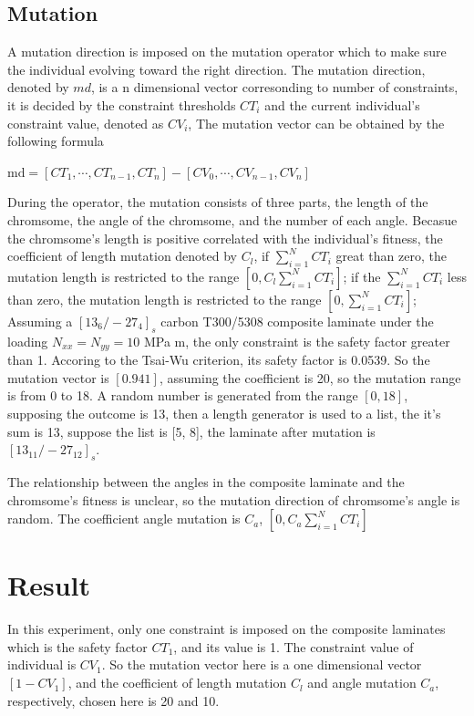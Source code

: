 \documentclass{article}
\begin{document}
\subsection{Mutation}
A mutation direction is imposed on the mutation operator which to make sure the individual evolving
toward the right direction. The mutation direction, denoted by $md$, is a n dimensional vector corresonding to
number of constraints, it is decided by the constraint thresholds $CT_i$ and the current individual's
constraint value, denoted as $CV_i$,  The mutation vector can be obtained by the following formula

$\text{md} = [CT_1, \cdots, CT_{n-1}, CT_n] -  [CV_0, \cdots, CV_{n-1}, CV_n]$

During the operator, the mutation consists of three parts, the length of the chromsome, the angle
of the chromsome, and the number of each angle. Becasue the chromsome's length is positive correlated with the individual's
fitness, the coefficient of length mutation denoted by $C_l$, if $\sum_{i=1}^{N}{CT_i}$ great than
zero, the mutation length is restricted to the range $[0,C_l \sum_{i=1}^{N}{CT_i}]$; if the
$\sum_{i=1}^{N}{CT_i}$ less than zero, the mutation length is restricted to the range
$[0,\sum_{i=1}^{N}{CT_i}]$; Assuming a $[13_6/-27_4]_s$ carbon T300/5308 composite laminate under
the loading $N_{xx} = N_{yy} = 10$ MPa m, the only constraint is the safety factor greater than 1.
Accoring to the Tsai-Wu criterion, its safety factor is 0.0539. So the mutation vector is $[0.941]$,
assuming the coefficient is 20, so the mutation range is from 0 to 18. A random number is generated
from the range $[0, 18]$, supposing the outcome is 13, then a length generator is used to a list,
the it's sum is 13, suppose the list is [5, 8], the laminate after mutation is $[13_{11}/-27_{12}]_s$.


The relationship between the angles in the composite laminate and the chromsome's fitness is
unclear, so the mutation direction of chromsome's angle is random. The coefficient angle mutation is
$C_a$, $[0,C_a \sum_{i=1}^{N}{CT_i}]$


\section{Result}
In this experiment, only one constraint is imposed on the composite laminates which is the safety
factor $CT_1$, and its value is 1. The constraint value of individual is $CV_1$. So the mutation
vector here is a one dimensional vector $[1 - CV_1 ]$, and the coefficient of length mutation $C_l$ and
angle mutation $C_a$, respectively, chosen here is 20 and 10. 
\end{document}
